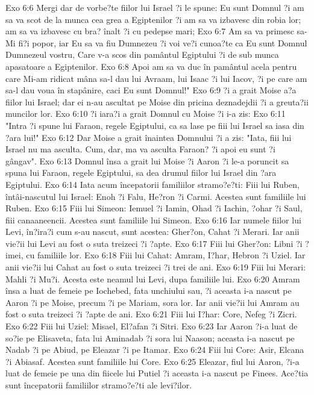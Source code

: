 Exo 6:6  Mergi dar de vorbe?te fiilor lui Israel ?i le spune: Eu sunt Domnul ?i am sa va scot de la munca cea grea a Egiptenilor ?i am sa va izbavesc din robia lor; am sa va izbavesc cu bra? înalt ?i cu pedepse mari;
Exo 6:7  Am sa va primesc sa-Mi fi?i popor, iar Eu sa va fiu Dumnezeu ?i voi ve?i cunoa?te ca Eu sunt Domnul Dumnezeul vostru, Care v-a scos din pamântul Egiptului ?i de sub munca apasatoare a Egiptenilor.
Exo 6:8  Apoi am sa va duc în pamântul acela pentru care Mi-am ridicat mâna sa-l dau lui Avraam, lui Isaac ?i lui Iacov, ?i pe care am sa-l dau voua în stapânire, caci Eu sunt Domnul!"
Exo 6:9  ?i a grait Moise a?a fiilor lui Israel; dar ei n-au ascultat pe Moise din pricina deznadejdii ?i a greuta?ii muncilor lor.
Exo 6:10  ?i iara?i a grait Domnul cu Moise ?i i-a zis:
Exo 6:11  "Intra ?i spune lui Faraon, regele Egiptului, ca sa lase pe fiii lui Israel sa iasa din ?ara lui!"
Exo 6:12  Dar Moise a grait înaintea Domnului ?i a zis: "Iata, fiii lui Israel nu ma asculta. Cum, dar, ma va asculta Faraon? ?i apoi eu sunt ?i gângav".
Exo 6:13  Domnul însa a grait lui Moise ?i Aaron ?i le-a poruncit sa spuna lui Faraon, regele Egiptului, sa dea drumul fiilor lui Israel din ?ara Egiptului.
Exo 6:14  Iata acum începatorii familiilor stramo?e?ti: Fiii lui Ruben, întâi-nascutul lui Israel: Enoh ?i Falu, He?ron ?i Carmi. Acestea sunt familiile lui Ruben.
Exo 6:15  Fiii lui Simeon: Iemuel ?i Iamin, Ohad ?i Iachin, ?ohar ?i Saul, fiii canaaneencii. Acestea sunt familiile lui Simeon.
Exo 6:16  Iar numele fiilor lui Levi, în?ira?i cum s-au nascut, sunt acestea: Gher?on, Cahat ?i Merari. Iar anii vie?ii lui Levi au fost o suta treizeci ?i ?apte.
Exo 6:17  Fiii lui Gher?on: Libni ?i ?imei, cu familiile lor.
Exo 6:18  Fiii lui Cahat: Amram, I?har, Hebron ?i Uziel. Iar anii vie?ii lui Cahat au fost o suta treizeci ?i trei de ani.
Exo 6:19  Fiii lui Merari: Mahli ?i Mu?i. Acesta este neamul lui Levi, dupa familiile lui.
Exo 6:20  Amram însa a luat de femeie pe Iochebed, fata unchiului sau, ?i aceasta i-a nascut pe Aaron ?i pe Moise, precum ?i pe Mariam, sora lor. Iar anii vie?ii lui Amram au fost o suta treizeci ?i ?apte de ani.
Exo 6:21  Fiii lui I?har: Core, Nefeg ?i Zicri.
Exo 6:22  Fiii lui Uziel: Misael, El?afan ?i Sitri.
Exo 6:23  Iar Aaron ?i-a luat de so?ie pe Elisaveta, fata lui Aminadab ?i sora lui Naason; aceasta i-a nascut pe Nadab ?i pe Abiud, pe Eleazar ?i pe Itamar.
Exo 6:24  Fiii lui Core: Asir, Elcana ?i Abiasaf. Acestea sunt familiile lui Core.
Exo 6:25  Eleazar, fiul lui Aaron, ?i-a luat de femeie pe una din fiicele lui Putiel ?i aceasta i-a nascut pe Finees. Ace?tia sunt începatorii familiilor stramo?e?ti ale levi?ilor.
